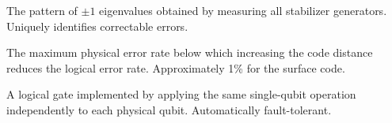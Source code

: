 \documentclass[11pt, a4paper]{article}
\theoremstyle{definition}
\theoremstyle{plain}
\theoremstyle{remark}
\begin{document}
\begin{description}[style=nextline, leftmargin=2.5cm, font=\bfseries]
  \item[Syndrome]
    The pattern of $\pm 1$ eigenvalues obtained by measuring all stabilizer
    generators.  Uniquely identifies correctable errors.

  \item[Threshold $p_{\rm th}$]
    The maximum physical error rate below which increasing the code distance
    reduces the logical error rate.  Approximately 1\% for the surface code.

  \item[Transversal gate]
    A logical gate implemented by applying the same single-qubit operation
    independently to each physical qubit.  Automatically fault-tolerant.

\end{description}
\end{document}
